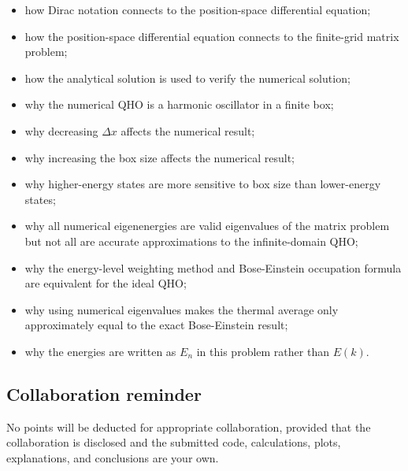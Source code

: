 \begin{itemize}
    \item how Dirac notation connects to the position-space differential equation;
    \item how the position-space differential equation connects to the finite-grid matrix problem;
    \item how the analytical solution is used to verify the numerical solution;
    \item why the numerical QHO is a harmonic oscillator in a finite box;
    \item why decreasing \(\Delta x\) affects the numerical result;
    \item why increasing the box size affects the numerical result;
    \item why higher-energy states are more sensitive to box size than lower-energy states;
    \item why all numerical eigenenergies are valid eigenvalues of the matrix problem but not all are accurate approximations to the infinite-domain QHO;
    \item why the energy-level weighting method and Bose-Einstein occupation formula are equivalent for the ideal QHO;
    \item why using numerical eigenvalues makes the thermal average only approximately equal to the exact Bose-Einstein result;
    \item why the energies are written as \(E_n\) in this problem rather than \(E(k)\).
\end{itemize}

\subsection{Collaboration reminder}

No points will be deducted for appropriate collaboration, provided that the collaboration is disclosed and the submitted code, calculations, plots, explanations, and conclusions are your own.